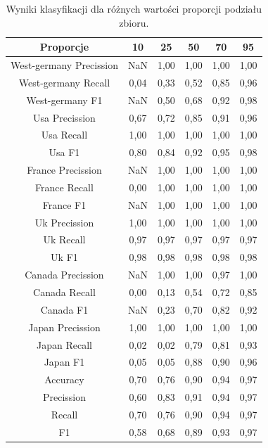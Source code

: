 \documentclass{classrep}
\begin{document}
\newpage
\begin{table}[h!]
\caption{Wyniki klasyfikacji dla różnych wartości proporcji podziału zbioru.}
\centering
\vspace{0.1cm}
 \begin{tabular}{c c c c c c}

    \textbf{Proporcje} & \textbf{10}   & \textbf{25}  & \textbf{50}  & \textbf{70}  & \textbf{95}\\

\hline
West-germany Precission 	& NaN & 1,00 & 1,00 & 1,00 & 1,00\\
West-germany Recall 		& 0,04 & 0,33 & 0,52 & 0,85 & 0,96\\
West-germany F1		& NaN & 0,50 & 0,68 & 0,92 & 0,98\\
\hline
Usa Precission 			& 0,67 & 0,72 & 0,85 & 0,91 & 0,96\\
Usa Recall				& 1,00 & 1,00 & 1,00 & 1,00 & 1,00\\
Usa F1			 	& 0,80 & 0,84 & 0,92 & 0,95 & 0,98\\
\hline
France Precission 		& NaN & 1,00 & 1,00 & 1,00 & 1,00\\
France Recall 			& 0,00 & 1,00 & 1,00 & 1,00 & 1,00\\
France F1 				& NaN & 1,00 & 1,00 & 1,00 & 1,00\\
\hline
Uk Precission 			& 1,00 & 1,00 & 1,00 & 1,00 & 1,00\\
Uk Recall 				& 0,97 & 0,97 & 0,97 & 0,97 & 0,97\\
Uk F1 				& 0,98 & 0,98 & 0,98 & 0,98 & 0,98\\
\hline
Canada Precission		& NaN & 1,00 & 1,00 & 0,97 & 1,00\\
Canada Recall 			& 0,00 & 0,13 & 0,54 & 0,72 & 0,85\\
Canada F1 			& NaN & 0,23 & 0,70 & 0,82 & 0,92\\
\hline
Japan Precission 		& 1,00 & 1,00 & 1,00 & 1,00 & 1,00\\
Japan Recall 			& 0,02 & 0,02 & 0,79 & 0,81 & 0,93\\
Japan F1 				& 0,05 & 0,05 & 0,88 & 0,90 & 0,96\\
\hline
Accuracy 				& 0,70 & 0,76 & 0,90 & 0,94 & 0,97\\
Precission 				& 0,60 & 0,83 & 0,91 & 0,94 & 0,97\\
Recall 				& 0,70 & 0,76 & 0,90 & 0,94 & 0,97\\
F1 					& 0,58 & 0,68 & 0,89 & 0,93 & 0,97\\

\end {tabular}
\label {Wyniki klasyfikacji dla różnych wartości proporcji podziału zbioru.}
\end{table}
\end{document}
